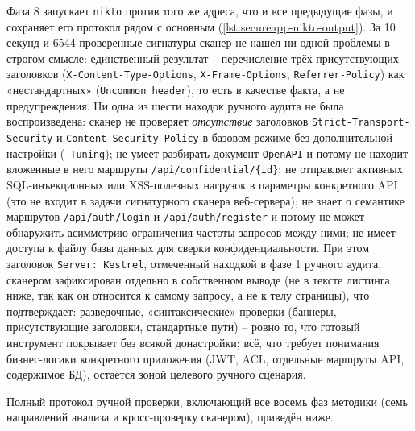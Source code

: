 Фаза 8 запускает \texttt{nikto} против того же адреса, что и все
предыдущие фазы, и сохраняет его протокол рядом с основным
(\autoref{lst:secureapp-nikto-output}). За 10 секунд и 6544 проверенные
сигнатуры сканер не нашёл ни одной проблемы в строгом смысле: единственный
результат -- перечисление трёх присутствующих заголовков
(\texttt{X-Content-Type-Options}, \texttt{X-Frame-Options},
\texttt{Referrer-Policy}) как «нестандартных» (\texttt{Uncommon header}),
то есть в качестве факта, а не предупреждения. Ни одна из шести находок
ручного аудита не была воспроизведена: сканер не проверяет
\emph{отсутствие} заголовков \texttt{Strict-Transport-Security} и
\texttt{Content-Security-Policy} в базовом режиме без дополнительной
настройки (\texttt{-Tuning}); не умеет разбирать документ
\texttt{OpenAPI} и потому не находит вложенные в него маршруты
\texttt{/api/confidential/\{id\}}; не отправляет активных
SQL-инъекционных или XSS-полезных нагрузок в параметры конкретного API
(это не входит в задачи сигнатурного сканера веб-сервера); не знает о
семантике маршрутов \texttt{/api/auth/login} и
\texttt{/api/auth/register} и потому не может обнаружить асимметрию
ограничения частоты запросов между ними; не имеет доступа к файлу базы
данных для сверки конфиденциальности. При этом заголовок
\texttt{Server: Kestrel}, отмеченный находкой в фазе 1 ручного аудита,
сканером зафиксирован отдельно в собственном выводе (не в тексте
листинга ниже, так как он относится к самому запросу, а не к телу
страницы), что подтверждает: разведочные, «синтаксические» проверки
(баннеры, присутствующие заголовки, стандартные пути) -- ровно то, что
готовый инструмент покрывает без всякой донастройки; всё, что требует
понимания бизнес-логики конкретного приложения (JWT, ACL, отдельные
маршруты API, содержимое БД), остаётся зоной целевого ручного сценария.


Полный протокол ручной проверки, включающий все восемь фаз методики
(семь направлений анализа и кросс-проверку сканером), приведён ниже.


\newpage
{}

